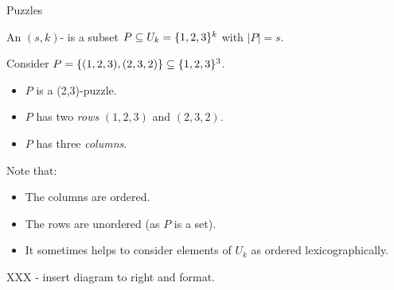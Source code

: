 \documentclass[t,10pt,
mathserif,xcolor=dvipsnames]{beamer}
\begin{document}
\begin{myframe}{Puzzles}

  \begin{definition}[Puzzle]
    An $(s,k)$-\emph{} is a subset $P \subseteq U_k = \{{1,2,3}\}^k$ with $|P| = s$.
  \end{definition}

  Consider $P = \{{(1,2,3), (2, 3, 2)}\} \subseteq \{{1,2,3}\}^3$.
  
  \begin{itemize}
  \item $P$ is a (2,3)-puzzle.
  \item $P$ has two \emph{rows} $(1,2,3)$ and $(2,3,2)$.
  \item $P$ has three \emph{columns}.
  \end{itemize}

  Note that:
  \begin{itemize}
  \item The columns are ordered.
  \item The rows are unordered (as $P$ is a set).
  \item It sometimes helps to consider elements of $U_k$ as ordered
    lexicographically.
  \end{itemize}

  XXX - insert diagram to right and format.
  
\end{myframe}
\end{document}
